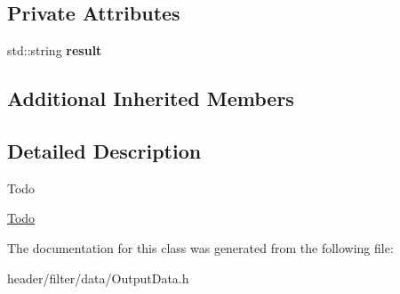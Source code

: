 \subsection*{Private Attributes}
\begin{DoxyCompactItemize}
\item 
\mbox{\label{classfilter_1_1data_1_1_output_data_a5af7ef1edf73cdb0d391ae0c5df0b3cd}} 
std\+::string {\bfseries result}
\end{DoxyCompactItemize}
\subsection*{Additional Inherited Members}


\subsection{Detailed Description}
\begin{DoxyRefDesc}{Todo}
\item[\hyperlink{todo__todo000025}{Todo}]\end{DoxyRefDesc}


The documentation for this class was generated from the following file\+:\begin{DoxyCompactItemize}
\item 
header/filter/data/Output\+Data.\+h\end{DoxyCompactItemize}
